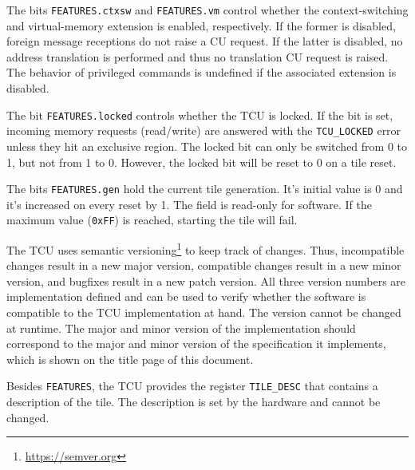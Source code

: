 The bits \texttt{FEATURES.ctxsw} and \texttt{FEATURES.vm} control whether the context-switching and
virtual-memory extension is enabled, respectively. If the former is disabled, foreign message
receptions do not raise a CU request. If the latter is disabled, no address translation is
performed and thus no translation CU request is raised. The behavior of privileged commands is
undefined if the associated extension is disabled.

The bit \texttt{FEATURES.locked} controls whether the TCU is locked. If the bit is set, incoming
memory requests (read/write) are answered with the \texttt{TCU\_LOCKED} error unless they hit an
exclusive region. The locked bit can only be switched from 0 to 1, but not from 1 to 0. However, the
locked bit will be reset to 0 on a tile reset.

The bits \texttt{FEATURES.gen} hold the current tile generation. It's initial value is 0 and it's
increased on every reset by 1. The field is read-only for software. If the maximum value
(\texttt{0xFF}) is reached, starting the tile will fail.

The TCU uses semantic versioning\footnote{\url{https://semver.org}} to keep track of changes. Thus,
incompatible changes result in a new major version, compatible changes result in a new minor
version, and bugfixes result in a new patch version. All three version numbers are implementation
defined and can be used to verify whether the software is compatible to the TCU implementation at
hand. The version cannot be changed at runtime. The major and minor version of the implementation
should correspond to the major and minor version of the specification it implements, which is shown
on the title page of this document.

Besides \texttt{FEATURES}, the TCU provides the register \texttt{TILE\_DESC} that contains a
description of the tile. The description is set by the hardware and cannot be changed.

